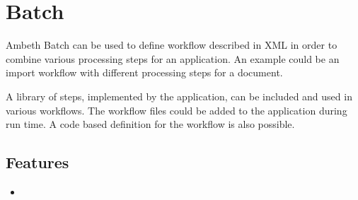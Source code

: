 \section{Batch}
\label{module:Batch}
\ClearAPI
\TODO
Ambeth Batch can be used to define workflow described in XML in order to combine various processing steps for an application.
An example could be an import workflow with different processing steps for a document.

A library of steps, implemented by the application, can be included and used in various workflows. The workflow files could be added to the application during run time. A code based definition for the workflow is also possible.

\subsection{Features}
\begin{itemize}
	\item \TODO
\end{itemize}

